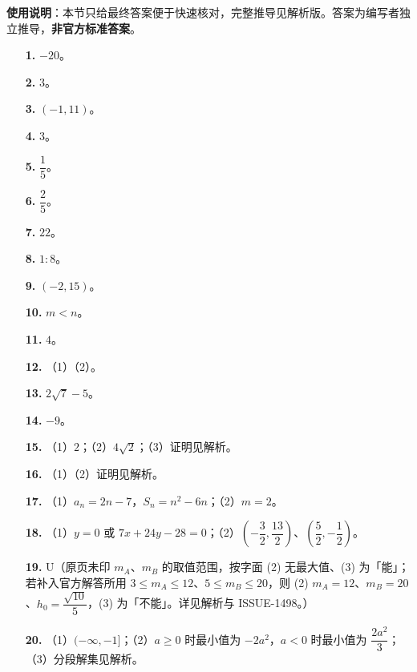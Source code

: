 
\begin{gknotice}
\textbf{使用说明}：本节只给最终答案便于快速核对，完整推导见解析版。答案为编写者独立推导，\textbf{非官方标准答案}。
\end{gknotice}

\begin{itemize}[leftmargin=2.6em]
  \item[\textbf{1.}] $-20$。
  \item[\textbf{2.}] $3$。
  \item[\textbf{3.}] $(-1,11)$。
  \item[\textbf{4.}] $3$。
  \item[\textbf{5.}] $\dfrac15$。
  \item[\textbf{6.}] $\dfrac25$。
  \item[\textbf{7.}] $22$。
  \item[\textbf{8.}] $1:8$。
  \item[\textbf{9.}] $(-2,15)$。
  \item[\textbf{10.}] $m<n$。
  \item[\textbf{11.}] $4$。
  \item[\textbf{12.}] （1）（2）。
  \item[\textbf{13.}] $2\sqrt7-5$。
  \item[\textbf{14.}] $-9$。
\end{itemize}

\begin{itemize}[leftmargin=2.6em]
  \item[\textbf{15.}] （1）$2$；（2）$4\sqrt2$；（3）证明见解析。
  \item[\textbf{16.}] （1）（2）证明见解析。
  \item[\textbf{17.}] （1）$a_n=2n-7$，$S_n=n^2-6n$；（2）$m=2$。
  \item[\textbf{18.}] （1）$y=0$ 或 $7x+24y-28=0$；（2）$\left(-\dfrac32,\dfrac{13}2\right)$、$\left(\dfrac52,-\dfrac12\right)$。
  \item[\textbf{19.}] U（原页未印 $m_A$、$m_B$ 的取值范围，按字面 (2) 无最大值、(3) 为「能」；若补入官方解答所用 $3\leqslant m_A\leqslant12$、$5\leqslant m_B\leqslant20$，则 (2) $m_A=12$、$m_B=20$、$h_0=\dfrac{\sqrt{10}}5$，(3) 为「不能」。详见解析与 ISSUE-1498。）
  \item[\textbf{20.}] （1）$(-\infty,-1]$；（2）$a\geqslant0$ 时最小值为 $-2a^2$，$a<0$ 时最小值为 $\dfrac{2a^2}3$；（3）分段解集见解析。
\end{itemize}

